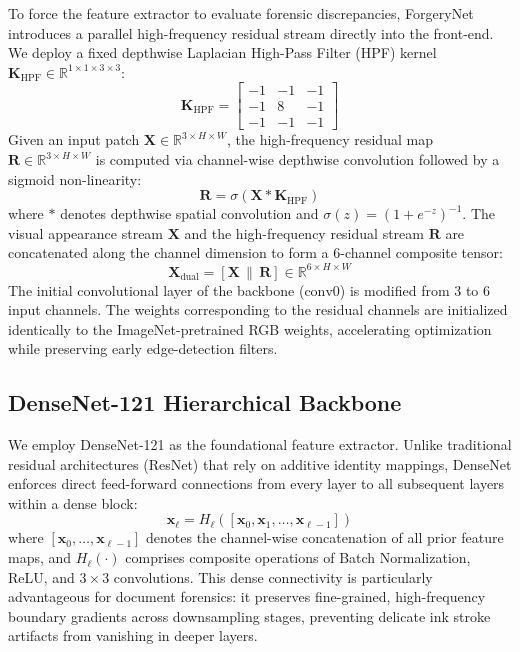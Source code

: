 \documentclass[pdflatex,sn-mathphys-num,iicol]{sn-jnl}
\begin{document}
To force the feature extractor to evaluate forensic discrepancies, ForgeryNet introduces a parallel high-frequency residual stream directly into the front-end. We deploy a fixed depthwise Laplacian High-Pass Filter (HPF) kernel $\mathbf{K}_{\text{HPF}} \in \mathbb{R}^{1 \times 1 \times 3 \times 3}$:
\begin{equation}
\mathbf{K}_{\text{HPF}} = \begin{bmatrix} -1 & -1 & -1 \\ -1 & 8 & -1 \\ -1 & -1 & -1 \end{bmatrix}\label{eq_hpf}
\end{equation}
Given an input patch $\mathbf{X} \in \mathbb{R}^{3 \times H \times W}$, the high-frequency residual map $\mathbf{R} \in \mathbb{R}^{3 \times H \times W}$ is computed via channel-wise depthwise convolution followed by a sigmoid non-linearity:
\begin{equation}
\mathbf{R} = \sigma\left(\mathbf{X} * \mathbf{K}_{\text{HPF}}\right)\label{eq_residual}
\end{equation}
where $*$ denotes depthwise spatial convolution and $\sigma(z) = (1 + e^{-z})^{-1}$. The visual appearance stream $\mathbf{X}$ and the high-frequency residual stream $\mathbf{R}$ are concatenated along the channel dimension to form a 6-channel composite tensor:
\begin{equation}
\mathbf{X}_{\text{dual}} = [\mathbf{X} \,\|\, \mathbf{R}] \in \mathbb{R}^{6 \times H \times W}\label{eq_concat}
\end{equation}
The initial convolutional layer of the backbone ($\text{conv0}$) is modified from 3 to 6 input channels. The weights corresponding to the residual channels are initialized identically to the ImageNet-pretrained RGB weights, accelerating optimization while preserving early edge-detection filters.

\subsection{DenseNet-121 Hierarchical Backbone}\label{subsec4_2}
We employ DenseNet-121 \cite{bib14} as the foundational feature extractor. Unlike traditional residual architectures (ResNet) that rely on additive identity mappings, DenseNet enforces direct feed-forward connections from every layer to all subsequent layers within a dense block:
\begin{equation}
\mathbf{x}_\ell = H_\ell([\mathbf{x}_0, \mathbf{x}_1, \dots, \mathbf{x}_{\ell-1}])\label{eq_dense}
\end{equation}
where $[\mathbf{x}_0, \dots, \mathbf{x}_{\ell-1}]$ denotes the channel-wise concatenation of all prior feature maps, and $H_\ell(\cdot)$ comprises composite operations of Batch Normalization, ReLU, and $3 \times 3$ convolutions. This dense connectivity is particularly advantageous for document forensics: it preserves fine-grained, high-frequency boundary gradients across downsampling stages, preventing delicate ink stroke artifacts from vanishing in deeper layers.
\end{document}
